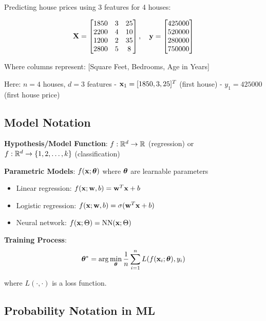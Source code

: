 \documentclass{article}
\newcounter{example}
\begin{document}
\begin{tcolorbox}[colback=blue!5!white,colframe=blue!75!black,title=Example \stepcounter{example}\#\theexample: House Price Dataset]
Predicting house prices using 3 features for 4 houses:

$$\mathbf{X} = \begin{bmatrix} 
1850 & 3 & 25 \\
2200 & 4 & 10 \\
1200 & 2 & 35 \\
2800 & 5 & 8
\end{bmatrix}, \quad \mathbf{y} = \begin{bmatrix} 
425000 \\
520000 \\
280000 \\
750000
\end{bmatrix}$$

Where columns represent: [Square Feet, Bedrooms, Age in Years]

Here: $n = 4$ houses, $d = 3$ features
- $\mathbf{x}_1 = [1850, 3, 25]^T$ (first house)
- $y_1 = 425000$ (first house price)
\end{tcolorbox}

\subsection{Model Notation}

\textbf{Hypothesis/Model Function}: $f: \mathbb{R}^d \rightarrow \mathbb{R}$ (regression) or $f: \mathbb{R}^d \rightarrow \{1,2,\ldots,k\}$ (classification)

\textbf{Parametric Models}: $f(\mathbf{x}; \boldsymbol{\theta})$ where $\boldsymbol{\theta}$ are learnable parameters
\begin{itemize}
    \item Linear regression: $f(\mathbf{x}; \mathbf{w}, b) = \mathbf{w}^T \mathbf{x} + b$
    \item Logistic regression: $f(\mathbf{x}; \mathbf{w}, b) = \sigma(\mathbf{w}^T \mathbf{x} + b)$
    \item Neural network: $f(\mathbf{x}; \Theta) = \text{NN}(\mathbf{x}; \Theta)$
\end{itemize}

\textbf{Training Process}:
$$\boldsymbol{\theta}^* = \arg\min_{\boldsymbol{\theta}} \frac{1}{n} \sum_{i=1}^n L(f(\mathbf{x}_i; \boldsymbol{\theta}), y_i)$$

where $L(\cdot, \cdot)$ is a loss function.

\subsection{Probability Notation in ML}
\end{document}
